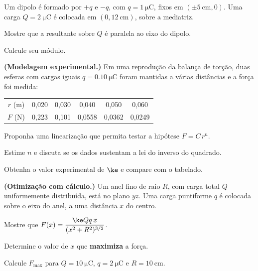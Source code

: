 \begin{questao}[3]{}

Um dipolo é formado por $+q$ e $-q$, com $q=\SI{1}{\micro\coulomb}$, fixos em
$(\pm\SI{5}{\centi\meter},0)$. Uma carga $Q=\SI{2}{\micro\coulomb}$ é colocada
em $(0,\SI{12}{\centi\meter})$, sobre a mediatriz.
\begin{itensq}
\item Mostre que a resultante sobre $Q$ é paralela ao eixo do dipolo.
\item Calcule seu módulo.
\end{itensq}


\end{questao}

\blocodesafio
\begin{questao}[4]{}

\textbf{(Modelagem experimental.)} Em uma reprodução da balança de torção, duas
esferas com cargas iguais $q=\SI{0.10}{\micro\coulomb}$ foram mantidas a várias
distâncias e a força foi medida:

\begin{center}
\begin{tabular}{cccccc}
\hline
$r$ (m) & 0,020 & 0,030 & 0,040 & 0,050 & 0,060\\
$F$ (N) & 0,223 & 0,101 & 0,0558 & 0,0362 & 0,0249\\
\hline
\end{tabular}
\end{center}

\begin{itensq}
\item Proponha uma linearização que permita testar a hipótese $F=C\,r^{n}$.
\item Estime $n$ e discuta se os dados sustentam a lei do inverso do quadrado.
\item Obtenha o valor experimental de $\ke$ e compare com o tabelado.
\end{itensq}


\end{questao}
\begin{questao}[4]{}

\textbf{(Otimização com cálculo.)} Um anel fino de raio $R$, com carga total $Q$
uniformemente distribuída, está no plano $yz$. Uma carga puntiforme $q$ é
colocada sobre o eixo do anel, a uma distância $x$ do centro.
\begin{itensq}
\item Mostre que $F(x)=\dfrac{\ke Q q\,x}{(x^{2}+R^{2})^{3/2}}$.
\item Determine o valor de $x$ que \textbf{maximiza} a força.
\item Calcule $F_{\max}$ para $Q=\SI{10}{\micro\coulomb}$,
      $q=\SI{2}{\micro\coulomb}$ e $R=\SI{10}{\centi\meter}$.
\end{itensq}


\end{questao}
